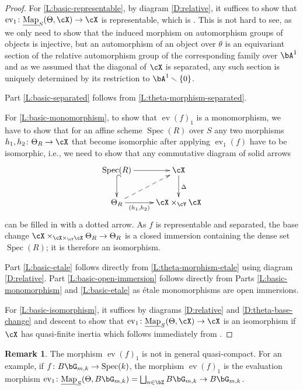 \documentclass[a4paper]{amsart}
\numberwithin{equation}{section}
\theoremstyle{plain}
\theoremstyle{definition}
\newtheorem{rem}[thm]{Remark}
\DeclareMathOperator{\Spec}{Spec}
\DeclareMathOperator{\ev}{ev}
\newcommand{\uMap}{\underline{{\rm Map}}}
\newcommand{\co}{\colon}
\begin{document}
\begin{proof}
For \eqref{L:basic-representable}, by diagram \eqref{D:relative}, it suffices to show that $\ev_1 \co \uMap_S(\Theta,\cX) \to \cX$ is representable, which is \cite[Prop.~1.1.13]{hlinstability}. {This is not hard to see, as we only need to show that the induced morphism on automorphism groups of objects is injective, but an automorphism of an object over $\theta$ is an equivariant section of the relative automorphism group of the corresponding family over $\bA^1$ and as we assumed that the diagonal of $\cX$ is separated, any such section is uniquely determined by its restriction to $\bA^1\smallsetminus \{0\}$.} 

Part \eqref{L:basic-separated} follows from  \ref{L:theta-morphism-separated}.

For \eqref{L:basic-monomorphism}, to show that $\ev(f)_1$ is a monomorphism, we have to show that for an affine scheme $\Spec(R)$ over $S$ any two morphisms $h_1,h_2\colon \Theta_R \to \cX$ that become isomorphic after applying $\ev_1(f)$ have to be isomorphic, i.e., we need to show that any commutative diagram of solid arrows
$$\xymatrix{
\Spec(R) \ar[r] \ar@{^(->}[d]			& \cX \ar[d]^{\Delta} \\
 \Theta_R \ar[r]_-{(h_1,h_2)}	\ar@{-->}[ur]				& \cX \times_{\cY} \cX
}$$
can be filled in with a dotted arrow.  As $f$ is representable and separated, the base change $\cX \times_{\cX \times_{\cY} \cX} \Theta_R \to \Theta_R$ is a closed immersion containing the dense set $\Spec(R)$; it is therefore an isomorphism.

Part \eqref{L:basic-etale} follows directly from  \ref{L:theta-morphism-etale} using diagram \eqref{D:relative}.  Part \eqref{L:basic-open-immersion} follows directly from Parts \eqref{L:basic-monomorphism} and \eqref{L:basic-etale} as \'etale monomorphisms are open immersions.

For \eqref{L:basic-isomorphism}, {it suffices by diagrams \eqref{D:relative} and \eqref{D:theta-base-change} and descent} to show that $\ev_1 \co \uMap_S(\Theta,\cX) \to \cX$ is an isomorphism if $\cX$ has quasi-finite inertia which follows immediately from .
\end{proof}



\begin{rem} \label{R:quasi-compact}
The morphism $\ev(f)_1$ is not in general quasi-compact.  For an example, if $f \co B \bG_{m,k} \to \Spec(k)$, the morphism $\ev(f)_1$ is the evaluation morphism $\ev_1 \co \uMap_S(\Theta,B\bG_{m,k}) = \bigsqcup_{n \in \bZ} B \bG_{m,k} \to B \bG_{m,k}$.  
\end{rem}
\end{document}
